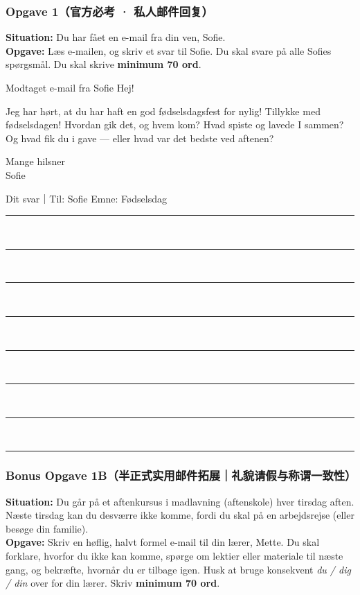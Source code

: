 
\subsubsection*{Opgave 1（官方必考 · 私人邮件回复）}

\textbf{Situation:} Du har fået en e-mail fra din ven, Sofie.\\
\textbf{Opgave:} Læs e-mailen, og skriv et svar til Sofie. Du skal svare på alle Sofies spørgsmål. Du skal skrive \textbf{minimum 70 ord}.

\begin{emailbox}{Modtaget e-mail fra Sofie}
Hej!

Jeg har hørt, at du har haft en god fødselsdagsfest for nylig! Tillykke med fødselsdagen! Hvordan gik det, og hvem kom? Hvad spiste og lavede I sammen? Og hvad fik du i gave --- eller hvad var det bedste ved aftenen?

Mange hilsner\\
Sofie
\end{emailbox}

\begin{emailbox}{Dit svar｜Til: Sofie \qquad Emne: Fødselsdag}
\vspace{0.3em}
\rule{\linewidth}{0.4pt}\\[0.55em]
\rule{\linewidth}{0.4pt}\\[0.55em]
\rule{\linewidth}{0.4pt}\\[0.55em]
\rule{\linewidth}{0.4pt}\\[0.55em]
\rule{\linewidth}{0.4pt}\\[0.55em]
\rule{\linewidth}{0.4pt}\\[0.55em]
\rule{\linewidth}{0.4pt}\\[0.55em]
\rule{\linewidth}{0.4pt}
\end{emailbox}

\subsubsection*{Bonus Opgave 1B（半正式实用邮件拓展｜礼貌请假与称谓一致性）}

\textbf{Situation:} Du går på et aftenkursus i madlavning (aftenskole) hver tirsdag aften. Næste tirsdag kan du desværre ikke komme, fordi du skal på en arbejdsrejse (eller besøge din familie).\\
\textbf{Opgave:} Skriv en høflig, halvt formel e-mail til din lærer, Mette. Du skal forklare, hvorfor du ikke kan komme, spørge om lektier eller materiale til næste gang, og bekræfte, hvornår du er tilbage igen. Husk at bruge konsekvent \textit{du / dig / din} over for din lærer. Skriv \textbf{minimum 70 ord}.

